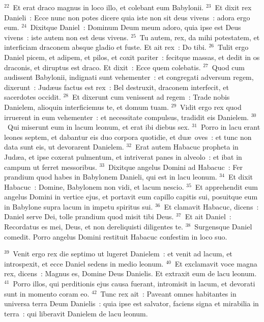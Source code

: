 ${}^{22}$~Et erat draco magnus in loco illo, et colebant eum Babylonii.
${}^{23}$~Et dixit rex Danieli~: Ecce nunc non potes dicere quia iste non sit deus vivens~: adora ergo eum.
${}^{24}$~Dixitque Daniel~: Dominum Deum meum adoro, quia ipse est Deus vivens~: iste autem non est deus vivens.
${}^{25}$~Tu autem, rex, da mihi potestatem, et interficiam draconem absque gladio et fuste. Et ait rex~: Do tibi.
${}^{26}$~Tulit ergo Daniel picem, et adipem, et pilos, et coxit pariter~: fecitque massas, et dedit in os draconis, et diruptus est draco. Et dixit~: Ecce quem colebatis.
${}^{27}$~Quod cum audissent Babylonii, indignati sunt vehementer~: et congregati adversum regem, dixerunt~: Jud\ae us factus est rex~: Bel destruxit, draconem interfecit, et sacerdotes occidit.
${}^{28}$~Et dixerunt cum venissent ad regem~: Trade nobis Danielem, alioquin interficiemus te, et domum tuam.
${}^{29}$~Vidit ergo rex quod irruerent in eum vehementer~: et necessitate compulsus, tradidit eis Danielem.
${}^{30}$~Qui miserunt eum in lacum leonum, et erat ibi diebus sex.
${}^{31}$~Porro in lacu erant leones septem, et dabantur eis duo corpora quotidie, et du\ae\ oves~: et tunc non data sunt eis, ut devorarent Danielem.
${}^{32}$~Erat autem Habacuc propheta in Jud\ae a, et ipse coxerat pulmentum, et intriverat panes in alveolo~: et ibat in campum ut ferret messoribus.
${}^{33}$~Dixitque angelus Domini ad Habacuc~: Fer prandium quod habes in Babylonem Danieli, qui est in lacu leonum.
${}^{34}$~Et dixit Habacuc~: Domine, Babylonem non vidi, et lacum nescio.
${}^{35}$~Et apprehendit eum angelus Domini in vertice ejus, et portavit eum capillo capitis sui, posuitque eum in Babylone supra lacum in impetu spiritus sui.
${}^{36}$~Et clamavit Habacuc, dicens~: Daniel serve Dei, tolle prandium quod misit tibi Deus.
${}^{37}$~Et ait Daniel~: Recordatus es mei, Deus, et non dereliquisti diligentes te.
${}^{38}$~Surgensque Daniel comedit. Porro angelus Domini restituit Habacuc confestim in loco suo.


${}^{39}$~Venit ergo rex die septimo ut lugeret Danielem~: et venit ad lacum, et introspexit, et ecce Daniel sedens in medio leonum.
${}^{40}$~Et exclamavit voce magna rex, dicens~: Magnus es, Domine Deus Danielis. Et extraxit eum de lacu leonum.
${}^{41}$~Porro illos, qui perditionis ejus causa fuerant, intromisit in lacum, et devorati sunt in momento coram eo.
${}^{42}$~Tunc rex ait~: Paveant omnes habitantes in universa terra Deum Danielis~: quia ipse est salvator, faciens signa et mirabilia in terra~: qui liberavit Danielem de lacu leonum.

